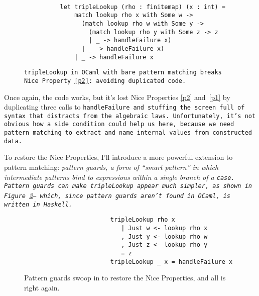 \documentclass[manuscript,screen,review, 12pt, nonacm]{acmart}
\begin{document}
    \begin{figure}[ht]
        \begin{verbatim}

          let tripleLookup (rho : finitemap) (x : int) =
              match lookup rho x with Some w -> 
                (match lookup rho w with Some y -> 
                  (match lookup rho y with Some z -> z
                  | _ -> handleFailure x)
                | _ -> handleFailure x)
              | _ -> handleFailure x
            \end{verbatim}
        \caption{\tt{tripleLookup} in OCaml with bare pattern matching breaks
                    Nice Property~\ref{p2}: avoiding duplicated code. } 
                    
        \label{fig:pmtriplelookup}
    \end{figure}

    Once again, the code works, but it's lost Nice Properties \ref{p2}
    and~\ref{p1} by duplicating three calls to \tt{handleFailure} and stuffing
    the screen full of syntax that distracts from the algebraic laws.
    Unfortunately, it's not obvious how a side condition could help us here,
    because we need pattern matching to extract and name internal values from
    constructed data.

    To restore the Nice Properties, I'll introduce a more powerful extension to
    pattern matching: \it{pattern guards}, a form of “smart pattern” in which
    intermediate patterns bind to expressions within a single branch of a
    \tt{case}. Pattern guards can make \tt{tripleLookup} appear \it{much}
    simpler, as shown in Figure~\ref{fig:guardtriplelookup}--- which, since
    pattern guards aren't found in OCaml, is written in Haskell.

    \begin{figure}
        \begin{center}
        \begin{verbatim}
                        tripleLookup rho x
                           | Just w <- lookup rho x
                           , Just y <- lookup rho w
                           , Just z <- lookup rho y
                           = z
                        tripleLookup _ x = handleFailure x
        \end{verbatim}
        \end{center}    
    \caption{Pattern guards swoop in to restore the Nice Properties, and all is
    right again.} 
    \label{fig:guardtriplelookup}
    \end{figure}
\end{document}
